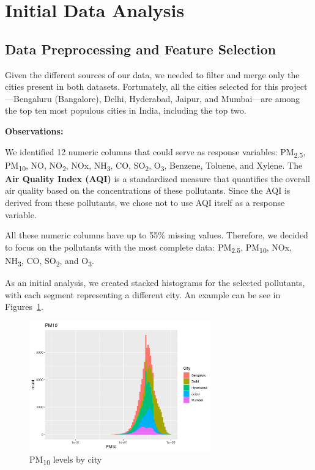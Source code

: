 \documentclass[12pt]{article}
\begin{document}
\newpage




\section{Initial Data Analysis}

\subsection{Data Preprocessing and Feature Selection}

Given the different sources of our data, we needed to filter and merge only the cities present in both datasets. Fortunately, all the cities selected for this project---Bengaluru (Bangalore), Delhi, Hyderabad, Jaipur, and Mumbai---are among the top ten most populous cities in India, including the top two.

\textbf{Observations:}

We identified 12 numeric columns that could serve as response variables: PM\textsubscript{2.5}, PM\textsubscript{10}, NO, NO\textsubscript{2}, NOx, NH\textsubscript{3}, CO, SO\textsubscript{2}, O\textsubscript{3}, Benzene, Toluene, and Xylene. The \textbf{Air Quality Index (AQI)} is a standardized measure that quantifies the overall air quality based on the concentrations of these pollutants. Since the AQI is derived from these pollutants, we chose not to use AQI itself as a response variable.

All these numeric columns have up to 55\% missing values. Therefore, we decided to focus on the pollutants with the most complete data: PM\textsubscript{2.5}, PM\textsubscript{10}, NOx, NH\textsubscript{3}, CO, SO\textsubscript{2}, and O\textsubscript{3}.

As an initial analysis, we created stacked histograms for the selected pollutants, with each segment representing a different city.
An example can be see in Figures~\ref{fig:pm10_by_city}.

\begin{figure}[H]
    \centering
    \includegraphics[width=0.7\textwidth]{pm10-by-city.png}
    \caption{PM\textsubscript{10} levels by city}
    \label{fig:pm10_by_city}
\end{figure}
\end{document}
